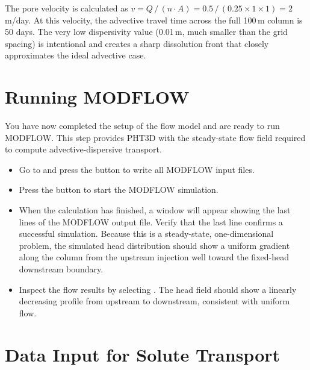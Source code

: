 \begin{tcolorbox}[notebox, title={Note}]
The pore velocity is calculated as $v = Q\,/\,(n \cdot A)
= 0.5\,/\,(0.25 \times 1 \times 1) = 2$\,m/day.  At this velocity,
the advective travel time across the full 100\,m column is 50 days.
The very low dispersivity value (0.01\,m, much smaller than the grid
spacing) is intentional and creates a sharp dissolution front that
closely approximates the ideal advective case.
\end{tcolorbox}

\section{Running MODFLOW}

You have now completed the setup of the flow model and are ready to run
MODFLOW\@.  This step provides PHT3D with the steady-state flow field
required to compute advective-dispersive transport.

\begin{itemize}

\item Go to  and press the
   button to write all MODFLOW input files.

\item Press the  button to start the MODFLOW simulation.

\item When the calculation has finished, a window will appear showing the
  last lines of the MODFLOW output file.  Verify that the last line
  confirms a successful simulation.  Because this is a steady-state,
  one-dimensional problem, the simulated head distribution should show a
  uniform gradient along the column from the upstream injection well
  toward the fixed-head downstream boundary.

\item Inspect the flow results by selecting .  The head field should show a linearly
  decreasing profile from upstream to downstream, consistent with
  uniform flow.

\end{itemize}

\section{Data Input for Solute Transport}

